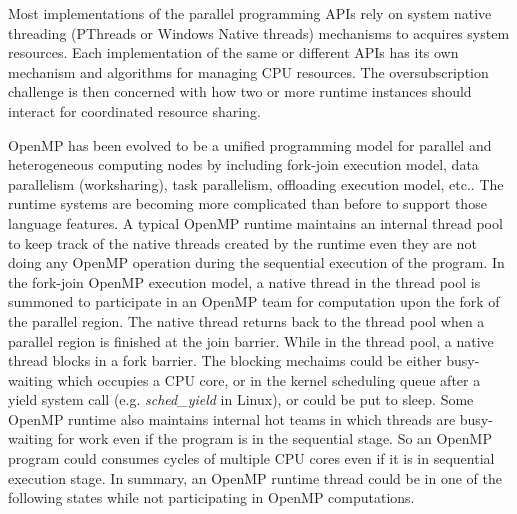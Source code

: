 
Most implementations of the parallel programming APIs rely on system 
native threading (PThreads or Windows Native threads) mechanisms to acquires system resources. 
Each implementation of the same or different APIs has its own mechanism and algorithms for managing
CPU resources. 
The oversubscription challenge is then concerned with how 
two or more runtime instances %
should interact for coordinated resource sharing. 

%


OpenMP has been evolved to be a unified programming model for 
parallel and heterogeneous computing nodes by including fork-join execution model, 
data parallelism (worksharing), task parallelism, offloading execution model, etc.. 
The runtime systems are becoming more complicated than before to support those language features.
A typical OpenMP runtime maintains 
an internal thread pool to keep track of the native threads created by the runtime even they are not  
doing any OpenMP operation during the sequential execution of the program. 
In the fork-join OpenMP execution model, a native thread in the thread pool 
is summoned to participate in an OpenMP team for computation upon the fork of the {\sf parallel} region. 
The native thread returns back to the thread pool when a parallel 
region is finished at the join barrier. While in the 
thread pool, a native thread blocks in a fork barrier. The blocking mechaims could be  
either busy-waiting which occupies a CPU core, or in the kernel
scheduling queue after a yield system call (e.g. {\em sched\_yield} in Linux), or could be put to sleep. 
Some OpenMP runtime also maintains
internal hot teams in which threads are busy-waiting for work even if the program is in the sequential stage. 
So an OpenMP program could consumes cycles of multiple CPU cores even if it is in sequential execution stage. In summary, an OpenMP runtime 
thread could be in one of the following states while not participating in OpenMP computations.  
